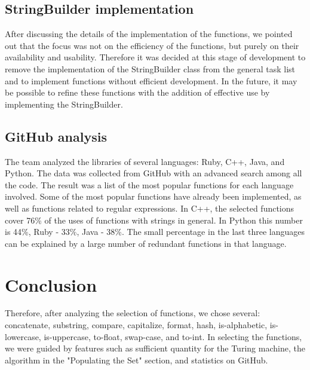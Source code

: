 \documentclass[11pt,nonacm,natbib=false]{acmart}
\begin{document}
\subsection{StringBuilder implementation}
\begin{inparaenum}
After discussing the details of the implementation of the functions, we pointed out that the focus was not on the efficiency of the functions, but purely on their availability and usability. Therefore it was decided at this stage of development to remove the implementation of the StringBuilder class from the general task list and to implement functions without efficient development. In the future, it may be possible to refine these functions with the addition of effective use by implementing the StringBuilder.
\end{inparaenum}
   
\subsection{GitHub analysis}
\begin{inparaenum}
The team analyzed the libraries of several languages: Ruby, C++, Java, and Python. The data was collected from GitHub with an advanced search among all the code. The result was a list of the most popular functions for each language involved. Some of the most popular functions have already been implemented, as well as functions related to regular expressions. In C++, the selected functions cover 76\% of the uses of functions with strings in general. In Python this number is 44\%, Ruby - 33\%, Java - 38\%. The small percentage in the last three languages can be explained by a large number of redundant functions in that language.
\end{inparaenum}


\section{Conclusion}
Therefore, after analyzing the selection of functions, we chose several: concatenate, substring, compare, capitalize, format, hash, is-alphabetic, is-lowercase, is-uppercase, to-float, swap-case, and to-int. In selecting the functions, we were guided by features such as sufficient quantity for the Turing machine, the algorithm in the "Populating the Set" section, and statistics on GitHub. 
\end{document}
